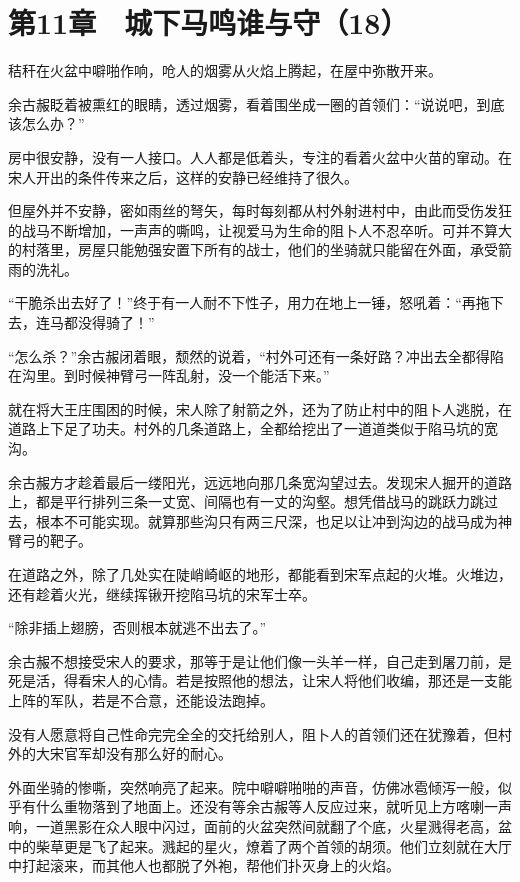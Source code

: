\section{第11章　城下马鸣谁与守（18）}

秸秆在火盆中噼啪作响，呛人的烟雾从火焰上腾起，在屋中弥散开来。

余古赧眨着被熏红的眼睛，透过烟雾，看着围坐成一圈的首领们：“说说吧，到底该怎么办？”

房中很安静，没有一人接口。人人都是低着头，专注的看着火盆中火苗的窜动。在宋人开出的条件传来之后，这样的安静已经维持了很久。

但屋外并不安静，密如雨丝的弩矢，每时每刻都从村外射进村中，由此而受伤发狂的战马不断增加，一声声的嘶鸣，让视爱马为生命的阻卜人不忍卒听。可并不算大的村落里，房屋只能勉强安置下所有的战士，他们的坐骑就只能留在外面，承受箭雨的洗礼。

“干脆杀出去好了！”终于有一人耐不下性子，用力在地上一锤，怒吼着：“再拖下去，连马都没得骑了！”

“怎么杀？”余古赧闭着眼，颓然的说着，“村外可还有一条好路？冲出去全都得陷在沟里。到时候神臂弓一阵乱射，没一个能活下来。”

就在将大王庄围困的时候，宋人除了射箭之外，还为了防止村中的阻卜人逃脱，在道路上下足了功夫。村外的几条道路上，全都给挖出了一道道类似于陷马坑的宽沟。

余古赧方才趁着最后一缕阳光，远远地向那几条宽沟望过去。发现宋人掘开的道路上，都是平行排列三条一丈宽、间隔也有一丈的沟壑。想凭借战马的跳跃力跳过去，根本不可能实现。就算那些沟只有两三尺深，也足以让冲到沟边的战马成为神臂弓的靶子。

在道路之外，除了几处实在陡峭崎岖的地形，都能看到宋军点起的火堆。火堆边，还有趁着火光，继续挥锹开挖陷马坑的宋军士卒。

“除非插上翅膀，否则根本就逃不出去了。”

余古赧不想接受宋人的要求，那等于是让他们像一头羊一样，自己走到屠刀前，是死是活，得看宋人的心情。若是按照他的想法，让宋人将他们收编，那还是一支能上阵的军队，若是不合意，还能设法跑掉。

没有人愿意将自己性命完完全全的交托给别人，阻卜人的首领们还在犹豫着，但村外的大宋官军却没有那么好的耐心。

外面坐骑的惨嘶，突然响亮了起来。院中噼噼啪啪的声音，仿佛冰雹倾泻一般，似乎有什么重物落到了地面上。还没有等余古赧等人反应过来，就听见上方喀喇一声响，一道黑影在众人眼中闪过，面前的火盆突然间就翻了个底，火星溅得老高，盆中的柴草更是飞了起来。溅起的星火，燎着了两个首领的胡须。他们立刻就在大厅中打起滚来，而其他人也都脱了外袍，帮他们扑灭身上的火焰。

